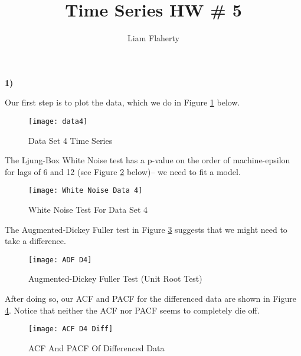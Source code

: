 \documentclass[12pt, letterpaper]{article}
\title{Time Series HW \# 5}
\author{Liam Flaherty}
\date{\parbox{\linewidth}{\centering%
		Professor Martin\endgraf\bigskip
		NCSU: ST534-001\endgraf\bigskip
		October 7, 2024 \endgraf}}
\theoremstyle{definition}
\numberwithin{equation}{section}
\newcommand{\+}[1]{+_{\scalebox{.375}{#1}}}
\newcommand{\1}{\mathbbm{1}}
\begin{document}
\maketitle
\thispagestyle{empty}

\newpage\clearpage\noindent


\noindent\textbf{1) }

\vspace{\baselineskip}
\noindent\textbf{}
\vspace{\baselineskip}

Our first step is to plot the data, which we do in Figure \ref{data4} below.

\begin{figure}[H]
	\centering
	\texttt{[image: data4]}
	\caption{Data Set 4 Time Series}
	\label{data4}
\end{figure}

The Ljung-Box White Noise test has a p-value on the order of machine-epsilon for lags of 6 and 12 (see Figure \ref{White Noise Data4} below)-- we need to fit a model.

\begin{figure}[H]
	\centering
	\texttt{[image: White Noise Data 4]}
	\caption{White Noise Test For Data Set 4}
	\label{White Noise Data4}
\end{figure} 
\vspace{\baselineskip}

The Augmented-Dickey Fuller test in Figure \ref{ADF D4} suggests that we might need to take a difference.

\begin{figure}[H]
	\centering
	\texttt{[image: ADF D4]}
	\caption{Augmented-Dickey Fuller Test (Unit Root Test)}
	\label{ADF D4}
\end{figure}

After doing so, our ACF and PACF for the differenced data are shown in Figure \ref{ACF D4 Diff}. Notice that neither the ACF nor PACF seems to completely die off.

\begin{figure}[H]
	\centering
	\texttt{[image: ACF D4 Diff]}
	\caption{ACF And PACF Of Differenced Data}
	\label{ACF D4 Diff}
\end{figure}
\end{document}
